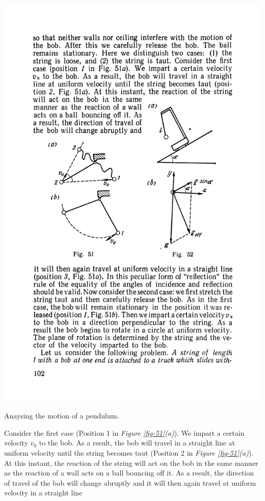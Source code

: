 \documentclass[a4paper,sfsidenotes]{tufte-book}
\begin{document}
\begin{marginfigure}
\centering
\includegraphics[width=\linewidth]{fig-051a.pdf}
\caption{Anaysing the motion of a pendulum.}
\label{fig-51}
\end{marginfigure}
Consider the first case (Position 1 in \emph{Figure \ref{fig-51}(a)}). We impart a certain velocity $v_{0}$ to the bob. As a result, the bob will travel in a straight line at uniform velocity until the string becomes taut (Position 2 in \emph{Figure \ref{fig-51}(a)}). At this instant, the reaction of the string will act on the bob in the same manner as the reaction of a wall acts on a ball bouncing off it. As a result, the direction of travel of the bob will change abruptly and it will then again travel at uniform velocity in a straight line
\end{document}
